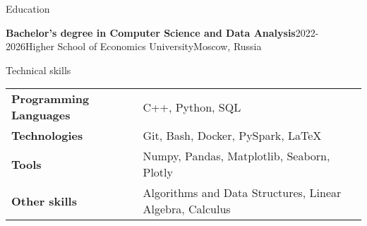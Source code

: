 \documentclass{resume} %
\makeatletter
\newcommand{\entry}[2]{#1 & #2 \tabularnewline} %
\newcommand{\tableEnv}[2]{%
  \begin{rSection}{#1} %
    \begin{adjustwidth}{0.0in}{0.1in} %
      \begin{tabularx}{\linewidth}{@{} >{\bfseries}l @{\hspace{6ex}} X @{}}
        #2 %
      \end{tabularx}
    \end{adjustwidth}
  \end{rSection}
}
\makeatother
\begin{document}

\begin{rSection}{Education}

    \begin{rSubsectionNoBullet}{\bf Bachelor's degree in Computer Science and Data Analysis}{2022-2026}{Higher School of Economics University}{Moscow, Russia}
        \item{}
    \end{rSubsectionNoBullet}
    

\end{rSection}





\tableEnv{Technical skills}{
    \entry{Programming Languages}{C++, Python, SQL}
    \entry{Technologies}{Git, Bash, Docker, PySpark, \LaTeX}
    \entry{Tools}{Numpy, Pandas, Matplotlib, Seaborn, Plotly}
    \entry{Other skills}{Algorithms and Data Structures, Linear Algebra, Calculus}
    
}

\end{document}
